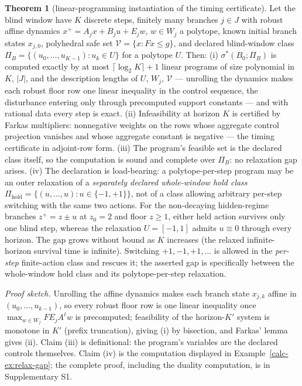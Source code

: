 \documentclass[10pt,twocolumn]{article}
\theoremstyle{definition}
\newtheorem{theorem}{Theorem}
\begin{document}
\begin{theorem}[linear-programming instantiation of the timing certificate]\label{calc-thm:lp-instant}
Let the blind window have \(K\) discrete steps, finitely many branches \(j \in J\) with
robust affine dynamics \(x^{+} = A_{j} x + B_{j} u + E_{j} w\), \(w \in W_{j}\) a polytope,
known initial branch states \(x_{j,0}\), polyhedral safe set \(\mathcal{V} = \{x : Fx \le g\}\),
and declared blind-window class \(\Pi_{B} = \{(u_{0},\dots,u_{K-1}) : u_{k} \in U\}\) for a
polytope \(U\). Then: (i) \(\sigma^{*}(B_{0}; \Pi_{B})\) is computed exactly by at most
\(\lceil \log_{2} K \rceil + 1\) linear programs of size polynomial in \(K\), \(|J|\), and the
description lengths of \(U\), \(W_{j}\), \(\mathcal{V}\) --- unrolling the dynamics makes each
robust floor row one linear inequality in the control sequence, the disturbance entering only
through precomputed support constants --- and with rational data every step is exact.
(ii) Infeasibility at horizon \(K\) is certified by Farkas multipliers: nonnegative weights on
the rows whose aggregate control projection vanishes and whose aggregate constant is negative
--- the timing certificate in adjoint-row form. (iii) The program's feasible set is the
declared class itself, so the computation is sound and complete over \(\Pi_{B}\): no relaxation
gap arises. (iv) The declaration is load-bearing: a polytope-per-step program may be
an outer relaxation of a \emph{separately declared whole-window hold class}
\(\Pi_{\mathrm{hold}}=\{(u,\dots,u):u\in\{-1,+1\}\}\), not of a
class allowing arbitrary per-step switching with the same two actions.
For the non-decaying hidden-regime branches \(z^+=z\pm u\) at
\(z_0=2\) and floor \(z\ge1\), either held action survives only one
blind step, whereas the relaxation \(U=[-1,1]\) admits \(u\equiv0\)
through every horizon. The gap grows without bound as \(K\) increases
(the relaxed infinite-horizon survival time is infinite). Switching
\(+1,-1,+1,\dots\) is allowed in the \emph{per-step} finite-action
class and rescues it; the asserted gap is specifically between the
whole-window hold class and its polytope-per-step relaxation.
\end{theorem}

\emph{Proof sketch.} Unrolling the affine dynamics makes each branch state
\(x_{j,k}\) affine in \((u_{0},\dots,u_{k-1})\), so every robust floor row is one linear
inequality once \(\max_{w \in W_{j}} F E_{j} A^{\ell} w\) is precomputed; feasibility of the
horizon-\(K'\) system is monotone in \(K'\) (prefix truncation), giving (i) by bisection, and
Farkas' lemma gives (ii). Claim (iii) is definitional: the program's variables are the declared
controls themselves. Claim (iv) is the computation displayed in
Example~\ref{calc-ex:relax-gap}; the complete proof, including the duality computation, is in
Supplementary S1.
\end{document}

